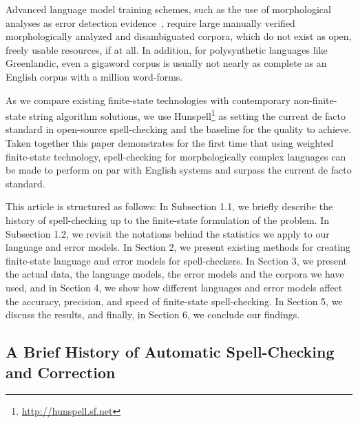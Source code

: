 \documentclass[postprint]{flammie}
\begin{document}
Advanced language model training schemes, such as the use of morphological
analyses as error detection evidence~\cite{mays1991context}, require large
manually verified morphologically analyzed and disambiguated corpora, which do
not exist as open, freely usable resources, if at all. In addition, for
polysynthetic languages like Greenlandic, even a gigaword corpus is usually not
nearly as complete as an English corpus with a million word-forms.

As we compare existing finite-state technologies with contemporary
non-finite-state string algorithm solutions, we use
Hunspell\footnote{\url{http://hunspell.sf.net}} as setting the current de facto
standard in open-source spell-checking and the baseline for the quality to
achieve.  Taken together this paper demonstrates for the first time that using
weighted finite-state technology, spell-checking for morphologically complex
languages can be made to perform on par with English systems and surpass the
current de facto standard.

This article is structured as follows: In Subsection 1.1, we briefly describe
the history of spell-checking up to the finite-state formulation of the
problem. In Subsection 1.2, we revisit the notations behind the statistics we
apply to our language and error models. In Section 2, we present existing
methods for creating finite-state language and error models for spell-checkers.
In Section 3, we present the actual data, the language models, the error
models and the corpora we have used, and in Section 4, we show how different
languages and error models affect the accuracy, precision, and speed of
finite-state spell-checking. In Section 5, we discuss the results, and finally,
in Section 6, we conclude our findings.

\subsection{A Brief History of Automatic Spell-Checking and Correction}
\end{document}
